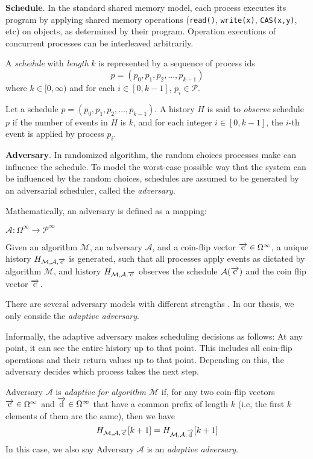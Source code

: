 \textbf{Schedule}.
In the standard shared memory model, each process executes its program by applying
shared memory operations (\texttt{read()}, \texttt{write(x)}, \texttt{CAS(x,y)}, etc) on objects,
as determined by their program. Operation executions of concurrent processes
can be interleaved arbitrarily.

A \emph{schedule} with \emph{length} $k$ is represented by a sequence of process ids
$$p = (p_0, p_1, p_2,..., p_{k-1})$$ where $k \in [0, \infty)$ and for each $i \in [0, k-1]$,
$p_i \in \mathcal{P}$.

Let a schedule $p = (p_0, p_1, p_2,..., p_{k-1})$.
A history $H$ is said to \emph{observe} schedule $p$ if the number of events in $H$ is $k$,
and for each integer $i \in [0, k-1]$, the $i$-th event is applied by process $p_i$.

\textbf{Adversary}.
In randomized algorithm, the random choices processes make can influence the schedule.
To model the worst-case possible way that the system can be influenced by the random choices,
schedules are assumed to be generated by an adversarial scheduler, called the \emph{adversary}.

Mathematically, an adversary is defined as a mapping:
\begin{center}
$\mathcal{A} :  \Omega^{\infty} \to \mathcal{P}^{\infty}$
\end{center}

Given an algorithm $\mathcal{M}$, an adversary $\mathcal{A}$, and
a coin-flip vector $\overrightarrow{\rm c} \in \Omega^{\infty}$,
a unique history $H_{\mathcal{M},\mathcal{A}, \overrightarrow{\rm c}}$ is generated, such that all
processes apply events as dictated by algorithm $\mathcal{M}$, and history
$H_{\mathcal{M}, \mathcal{A}, \overrightarrow{\rm c}}$
observes the schedule $\mathcal{A(\overrightarrow{\rm c})}$ and the coin flip vector $\overrightarrow{\rm c}$.

There are several adversary models with different strengths \cite{DBLP:journals/corr/cs-DS-0209014}.
In our thesis, we only conside the \emph{adaptive adversary}.

Informally, the adaptive adversary makes scheduling
decisions as follows: At any point, it can see the entire history up to that point.
This includes all coin-flip operations and their return values up to that point. Depending on this,
the adversary decides which process takes the next step.

Adversary $\mathcal{A}$ is \emph{adaptive for algorithm $\mathcal{M}$} \cite{golab2011linearizable}
if, for any two coin-flip
vectors $\overrightarrow{\rm c} \in \Omega^{\infty}$ and $\overrightarrow{\rm d} \in \Omega^{\infty}$ that have a common prefix
of length $k$ (i.e, the first $k$ elements of them are the same), then we have
$$H_{\mathcal{M},\mathcal{A}, \overrightarrow{\rm c}}[k+1] = H_{\mathcal{M},\mathcal{A}, \overrightarrow{\rm d}}[k+1]$$
In this case, we also say Adversary $\mathcal{A}$ is an \emph{adaptive adversary}.

